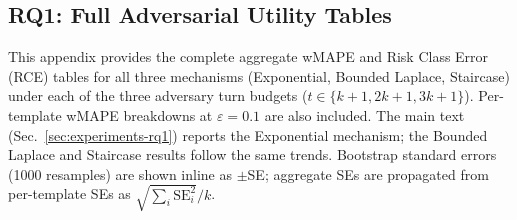 \subsection{RQ1: Full Adversarial Utility Tables}
\label{app:rq1-tables}

This appendix provides the complete aggregate wMAPE and Risk Class Error (RCE) tables for all three mechanisms (Exponential, Bounded Laplace, Staircase) under each of the three adversary turn budgets ($t \in \{k{+}1, 2k{+}1, 3k{+}1\}$). Per-template wMAPE breakdowns at $\varepsilon = 0.1$ are also included. The main text (Sec.~\ref{sec:experiments-rq1}) reports the Exponential mechanism; the Bounded Laplace and Staircase results follow the same trends. Bootstrap standard errors (1000 resamples) are shown inline as {\scriptsize $\pm$SE}; aggregate SEs are propagated from per-template SEs as $\sqrt{\sum_i \mathrm{SE}_i^2}/k$.

